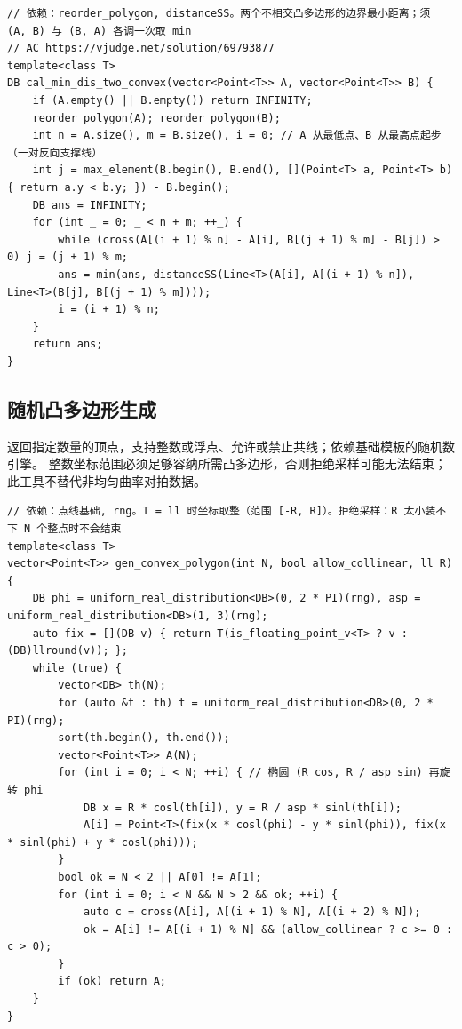 \begin{verbatim}
// 依赖：reorder_polygon, distanceSS。两个不相交凸多边形的边界最小距离；须 (A, B) 与 (B, A) 各调一次取 min
// AC https://vjudge.net/solution/69793877
template<class T>
DB cal_min_dis_two_convex(vector<Point<T>> A, vector<Point<T>> B) {
	if (A.empty() || B.empty()) return INFINITY;
	reorder_polygon(A); reorder_polygon(B);
	int n = A.size(), m = B.size(), i = 0; // A 从最低点、B 从最高点起步（一对反向支撑线）
	int j = max_element(B.begin(), B.end(), [](Point<T> a, Point<T> b) { return a.y < b.y; }) - B.begin();
	DB ans = INFINITY;
	for (int _ = 0; _ < n + m; ++_) {
		while (cross(A[(i + 1) % n] - A[i], B[(j + 1) % m] - B[j]) > 0) j = (j + 1) % m;
		ans = min(ans, distanceSS(Line<T>(A[i], A[(i + 1) % n]), Line<T>(B[j], B[(j + 1) % m])));
		i = (i + 1) % n;
	}
	return ans;
}
\end{verbatim}

	\newpage


	\subsection{随机凸多边形生成}
	返回指定数量的顶点，支持整数或浮点、允许或禁止共线；依赖基础模板的随机数引擎。
	整数坐标范围必须足够容纳所需凸多边形，否则拒绝采样可能无法结束；此工具不替代非均匀曲率对拍数据。

\begin{verbatim}
// 依赖：点线基础, rng。T = ll 时坐标取整（范围 [-R, R]）。拒绝采样：R 太小装不下 N 个整点时不会结束
template<class T>
vector<Point<T>> gen_convex_polygon(int N, bool allow_collinear, ll R) {
	DB phi = uniform_real_distribution<DB>(0, 2 * PI)(rng), asp = uniform_real_distribution<DB>(1, 3)(rng);
	auto fix = [](DB v) { return T(is_floating_point_v<T> ? v : (DB)llround(v)); };
	while (true) {
		vector<DB> th(N);
		for (auto &t : th) t = uniform_real_distribution<DB>(0, 2 * PI)(rng);
		sort(th.begin(), th.end());
		vector<Point<T>> A(N);
		for (int i = 0; i < N; ++i) { // 椭圆 (R cos, R / asp sin) 再旋转 phi
			DB x = R * cosl(th[i]), y = R / asp * sinl(th[i]);
			A[i] = Point<T>(fix(x * cosl(phi) - y * sinl(phi)), fix(x * sinl(phi) + y * cosl(phi)));
		}
		bool ok = N < 2 || A[0] != A[1];
		for (int i = 0; i < N && N > 2 && ok; ++i) {
			auto c = cross(A[i], A[(i + 1) % N], A[(i + 2) % N]);
			ok = A[i] != A[(i + 1) % N] && (allow_collinear ? c >= 0 : c > 0);
		}
		if (ok) return A;
	}
}
\end{verbatim}

